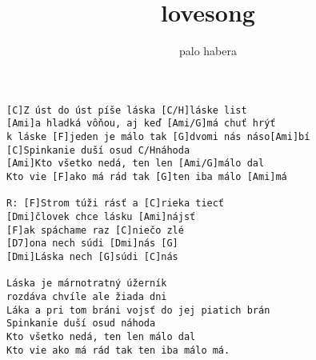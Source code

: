 \author{palo habera}
\title{lovesong}
\maketitle
\begin{verbatim}
[C]Z úst do úst píše láska [C/H]láske list
[Ami]a hladká vôňou, aj keď [Ami/G]má chuť hrýť
k láske [F]jeden je málo tak [G]dvomi nás náso[Ami]bí
[C]Spinkanie duší osud C/Hnáhoda
[Ami]Kto všetko nedá, ten len [Ami/G]málo dal
Kto vie [F]ako má rád tak [G]ten iba málo [Ami]má

R: [F]Strom túži rásť a [C]rieka tiecť
[Dmi]človek chce lásku [Ami]nájsť
[F]ak spáchame raz [C]niečo zlé
[D7]ona nech súdi [Dmi]nás [G]
[Dmi]Láska nech [G]súdi [C]nás

Láska je márnotratný úžerník
rozdáva chvíle ale žiada dni
Láka a pri tom bráni vojsť do jej piatich brán
Spinkanie duší osud náhoda
Kto všetko nedá, ten len málo dal
Kto vie ako má rád tak ten iba málo má.
\end{verbatim}

